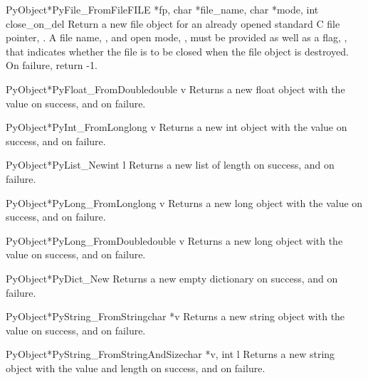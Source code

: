 \begin{cfuncdesc}{PyObject*}{PyFile_FromFile}{FILE *fp, char *file_name, char *mode, int close_on_del}
Return a new file object for an already opened standard C
file pointer, .  A file name, , and open mode,
, must be provided as well as a flag, , that
indicates whether the file is to be closed when the file
object is destroyed.  On failure, return -1.
\end{cfuncdesc}

\begin{cfuncdesc}{PyObject*}{PyFloat_FromDouble}{double v}
Returns a new float object with the value  on success, and
\NULL{} on failure.
\end{cfuncdesc}

\begin{cfuncdesc}{PyObject*}{PyInt_FromLong}{long v}
Returns a new int object with the value  on success, and
\NULL{} on failure.
\end{cfuncdesc}

\begin{cfuncdesc}{PyObject*}{PyList_New}{int l}
Returns a new list of length  on success, and \NULL{} on
failure.
\end{cfuncdesc}

\begin{cfuncdesc}{PyObject*}{PyLong_FromLong}{long v}
Returns a new long object with the value  on success, and
\NULL{} on failure.
\end{cfuncdesc}

\begin{cfuncdesc}{PyObject*}{PyLong_FromDouble}{double v}
Returns a new long object with the value  on success, and
\NULL{} on failure.
\end{cfuncdesc}

\begin{cfuncdesc}{PyObject*}{PyDict_New}{}
Returns a new empty dictionary on success, and \NULL{} on
failure.
\end{cfuncdesc}

\begin{cfuncdesc}{PyObject*}{PyString_FromString}{char *v}
Returns a new string object with the value  on success, and
\NULL{} on failure.
\end{cfuncdesc}

\begin{cfuncdesc}{PyObject*}{PyString_FromStringAndSize}{char *v, int l}
Returns a new string object with the value  and length 
on success, and \NULL{} on failure.
\end{cfuncdesc}

